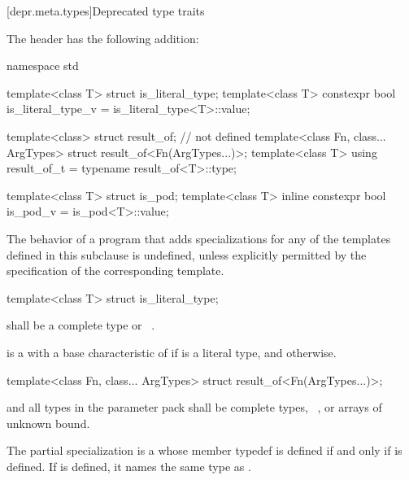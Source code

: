 [depr.meta.types]{Deprecated type traits}

\pnum
The header
%
 has the following addition:

%
\begin{codeblock}
namespace std {
  template<class T> struct is_literal_type;
  template<class T> constexpr bool is_literal_type_v = is_literal_type<T>::value;

  template<class> struct result_of;    // not defined
  template<class Fn, class... ArgTypes> struct result_of<Fn(ArgTypes...)>;
  template<class T> using result_of_t = typename result_of<T>::type;

  template<class T> struct is_pod;
  template<class T> inline constexpr bool is_pod_v = is_pod<T>::value;
}
\end{codeblock}

\pnum
The behavior of a program that adds specializations for
any of the templates defined in this subclause is undefined,
unless explicitly permitted by the specification of the corresponding template.

\begin{itemdecl}
template<class T> struct is_literal_type;
\end{itemdecl}

\begin{itemdescr}
\pnum
\requires
{} shall be a complete type or \cv{}~.

\pnum
{} is a 
with a base characteristic of 
if  is a literal type, and
 otherwise.
\end{itemdescr}

\begin{itemdecl}
template<class Fn, class... ArgTypes> struct result_of<Fn(ArgTypes...)>;
\end{itemdecl}

\begin{itemdescr}
\pnum
\requires
{} and all types in the parameter pack  shall be complete types,
\cv{}~, or arrays of unknown bound.

\pnum
The partial specialization  is a
 whose member typedef  is defined
if and only if  is defined.
If  is defined, it names the same type as .
\end{itemdescr}

